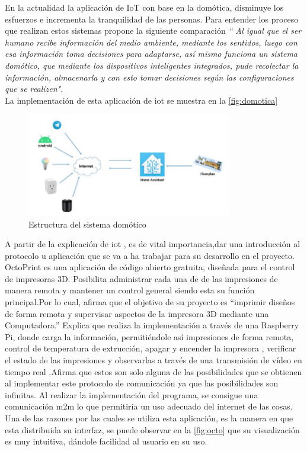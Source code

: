 En la actualidad la aplicación de IoT con base en la domótica, disminuye los esfuerzos e incrementa la tranquilidad de las personas. Para entender los proceso que realizan estos sistemas \citep{fernandez} propone la siguiente comparación \textit{“ Al igual que el ser humano recibe información del medio ambiente, mediante
los sentidos, luego con esa información toma decisiones para adaptarse, así mismo funciona un sistema domótico, que mediante los dispositivos inteligentes integrados, pude recolectar la información, almacenarla y con esto tomar decisiones según las configuraciones que se realizen"}.\\

La implementación de esta aplicación de \acrshort{iot} se muestra en la \autoref{fig:domotica}

\begin{figure}[H]
    \centering
    \includegraphics[width=0.8\textwidth]{Figs/iot.PNG}
    \caption{Estructura del sistema domótico \citep{tinoco} }
     \label{fig:domotica}
\end{figure}


A partir de la explicación de \acrshort{iot} , es de vital importancia,dar una introducción al protocolo u aplicación que se va a ha trabajar para su desarrollo en el proyecto.\\

OctoPrint es una aplicación de código abierto gratuita, diseñada para el control de impresoras 3D. Posibilita administrar cada una de de las impresiones de manera remota y mantener un control general siendo esta su función principal.Por lo cual, \citep{mp} afirma que el objetivo de su proyecto es “imprimir diseños
de forma remota y supervisar aspectos de la impresora 3D mediante una
Computadora.'' Explica que realiza la implementación a través de una Raspberry Pi, donde carga la información, permitiéndole así impresiones de forma remota, control de temperatura de extrucción, apagar y encender la impresora , verificar el estado de las impresiones y observarlas a través de una transmisión de vídeo en tiempo real .Afirma que estos son solo alguna de las posibilidades que se obtienen al implementar este protocolo de comunicación ya que las posibilidades son infinitas.  Al realizar la implementación del programa, se consigue una comunicación \acrshort{m2m} lo que permitiría un uso adecuado del internet de las cosas. Una de las razones por las cuales se utiliza esta aplicación, es la manera en que esta distribuida su interfaz, se puede observar en la \autoref{fig:octo} que su visualización es muy intuitiva, dándole facilidad al usuario en su uso.


